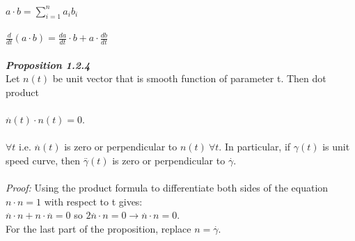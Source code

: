 \documentclass[12pt]{article}
\begin{document}
\( a \cdot b = \sum_{i=1}^{n} a_i b_i \) \\
\\
\( \frac{d}{dt} (a \cdot b) = \frac{da}{dt} \cdot b + a \cdot \frac{db}{dt} \)
\\
\\
\emph{\bfseries Proposition 1.2.4} \\
Let \( n(t) \) be unit vector that is smooth function of parameter t. Then dot product \\
\\
\( \overset{.}{n}(t) \cdot n(t) = 0 \). \\
\\
\( \forall t \) i.e. \( \overset{.}{n}(t) \) is zero or perpendicular to \( n(t) \ \forall t \). In particular, if \( \gamma(t) \) is unit speed curve, then \( \overset{..}{\gamma}(t) \) is zero or perpendicular to \( \overset{.}{\gamma} \).
\\
\\
\emph{Proof: } Using the product formula to differentiate both sides of the equation \( n \cdot n = 1 \) with respect to t gives: \\
\( \overset{.}{n} \cdot n + n \cdot \overset{.}{n} = 0 \) so \( 2 \overset{.}{n} \cdot n = 0 \longrightarrow \overset{.}{n} \cdot n = 0 \). \\
For the last part of the proposition, replace \( n = \overset{.}{\gamma} \).
\end{document}
